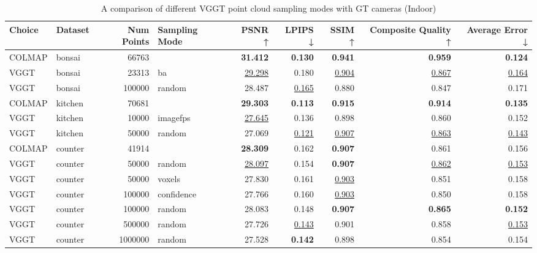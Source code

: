 \begin{table}[H]
\caption{\ifdefined\customcaption \customcaption \else A comparison of different VGGT point cloud sampling modes with GT cameras (Indoor) \fi}
\label{tab:03_sampling_mode_gt_cams_indoor}
\centering
\scriptsize
\begin{tabular}{llrlrrrrr}
\toprule
Choice & Dataset & Num Points & Sampling Mode & PSNR ↑ & LPIPS ↓ & SSIM ↑ & Composite Quality ↑ & Average Error ↓ \\
\midrule
COLMAP & bonsai & 66763 &  & \textbf{31.412} & \textbf{0.130} & \textbf{0.941} & \textbf{0.959} & \textbf{0.124} \\
VGGT & bonsai & 23313 & ba & \underline{29.298} & 0.180 & \underline{0.904} & \underline{0.867} & \underline{0.164} \\
VGGT & bonsai & 100000 & random & 28.487 & \underline{0.165} & 0.880 & 0.847 & 0.171 \\
\midrule
COLMAP & kitchen & 70681 &  & \textbf{29.303} & \textbf{0.113} & \textbf{0.915} & \textbf{0.914} & \textbf{0.135} \\
VGGT & kitchen & 10000 & imagefps & \underline{27.645} & 0.136 & 0.898 & 0.860 & 0.152 \\
VGGT & kitchen & 50000 & random & 27.069 & \underline{0.121} & \underline{0.907} & \underline{0.863} & \underline{0.143} \\
\midrule
COLMAP & counter & 41914 &  & \textbf{28.309} & 0.162 & \textbf{0.907} & 0.861 & 0.156 \\
VGGT & counter & 50000 & random & \underline{28.097} & 0.154 & \textbf{0.907} & \underline{0.862} & \underline{0.153} \\
VGGT & counter & 50000 & voxels & 27.830 & 0.161 & \underline{0.903} & 0.851 & 0.158 \\
VGGT & counter & 100000 & confidence & 27.766 & 0.160 & \underline{0.903} & 0.850 & 0.158 \\
VGGT & counter & 100000 & random & 28.083 & 0.148 & \textbf{0.907} & \textbf{0.865} & \textbf{0.152} \\
VGGT & counter & 500000 & random & 27.726 & \underline{0.143} & 0.901 & 0.858 & \underline{0.153} \\
VGGT & counter & 1000000 & random & 27.528 & \textbf{0.142} & 0.898 & 0.854 & 0.154 \\
\bottomrule
\end{tabular}
\end{table}